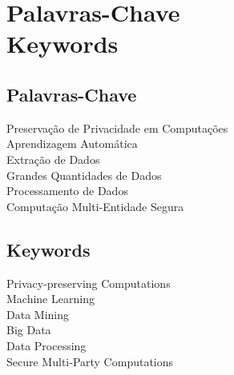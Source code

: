 %

\chapter*{Palavras-Chave \\ Keywords}
\thispagestyle{empty}

\section*{Palavras-Chave} %
{\large

Preserva\c{c}\~{a}o de Privacidade em Computa\c{c}\~{o}es      \\
Aprendizagem Autom\'{a}tica         \\
Extra\c{c}\~{a}o de Dados          \\
Grandes Quantidades de Dados                                \\
Processamento de Dados                  \\
Computa\c{c}\~{a}o Multi-Entidade Segura \\
}

\section*{Keywords} %
{\large
Privacy-preserving Computations\\
Machine Learning               \\
Data Mining					   \\
Big Data 					   \\
Data Processing                \\
Secure Multi-Party Computations\\
}

\vfill

\cleardoublepage
